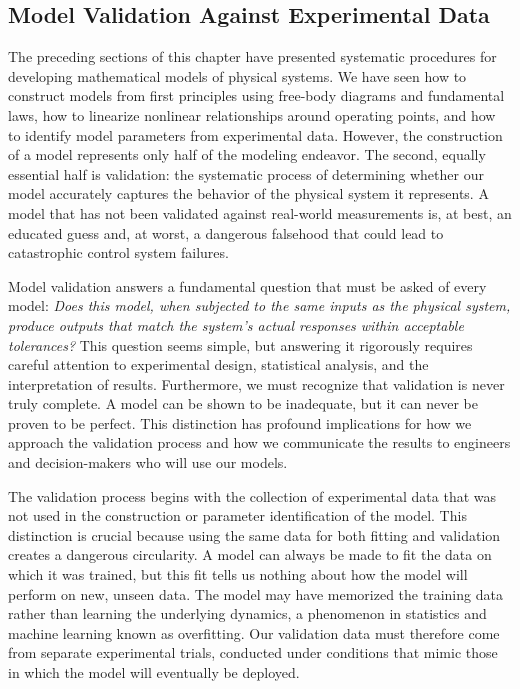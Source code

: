\subsection{Model Validation Against Experimental Data}

The preceding sections of this chapter have presented systematic procedures for developing mathematical models of physical systems. We have seen how to construct models from first principles using free-body diagrams and fundamental laws, how to linearize nonlinear relationships around operating points, and how to identify model parameters from experimental data. However, the construction of a model represents only half of the modeling endeavor. The second, equally essential half is validation: the systematic process of determining whether our model accurately captures the behavior of the physical system it represents. A model that has not been validated against real-world measurements is, at best, an educated guess and, at worst, a dangerous falsehood that could lead to catastrophic control system failures.

Model validation answers a fundamental question that must be asked of every model: \emph{Does this model, when subjected to the same inputs as the physical system, produce outputs that match the system's actual responses within acceptable tolerances?} This question seems simple, but answering it rigorously requires careful attention to experimental design, statistical analysis, and the interpretation of results. Furthermore, we must recognize that validation is never truly complete. A model can be shown to be inadequate, but it can never be proven to be perfect. This distinction has profound implications for how we approach the validation process and how we communicate the results to engineers and decision-makers who will use our models.

The validation process begins with the collection of experimental data that was not used in the construction or parameter identification of the model. This distinction is crucial because using the same data for both fitting and validation creates a dangerous circularity. A model can always be made to fit the data on which it was trained, but this fit tells us nothing about how the model will perform on new, unseen data. The model may have memorized the training data rather than learning the underlying dynamics, a phenomenon in statistics and machine learning known as overfitting. Our validation data must therefore come from separate experimental trials, conducted under conditions that mimic those in which the model will eventually be deployed.


